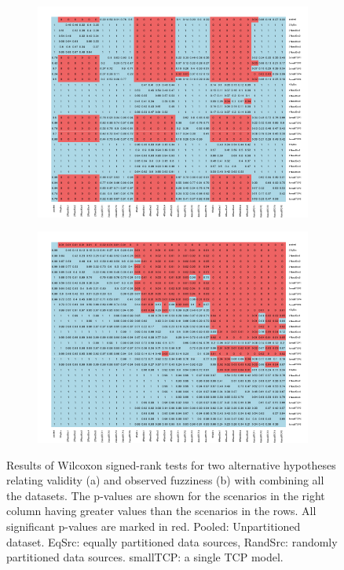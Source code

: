 \documentclass[preprint,12pt,authoryear]{elsarticle}
\begin{document}
\begin{figure}[H]
\centering
\begin{subfigure}{\textwidth}
  \centering
  \includegraphics[width=.75\linewidth]{heatmapCombined}
\end{subfigure}%

\begin{subfigure}{\textwidth}
  \centering
  \includegraphics[width=.75\linewidth]{heatmapCombined_eff}
\end{subfigure}%
\caption{Results of Wilcoxon signed-rank tests for two alternative hypotheses relating validity (a) and observed fuzziness (b) with combining all the datasets. The p-values are shown for the scenarios in the right column having greater values than the scenarios in the rows. All significant p-values are marked in red. Pooled: Unpartitioned dataset. EqSrc: equally partitioned data sources, RandSrc: randomly partitioned data sources. smallTCP: a single TCP model.} \label{fig:testCombined}
\end{figure}
\end{document}
